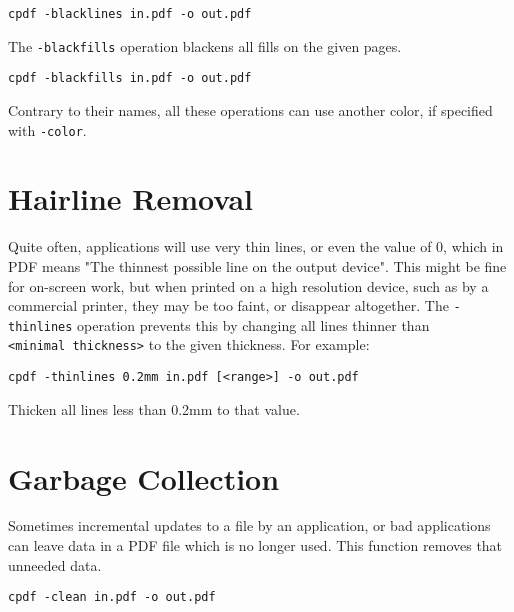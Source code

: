 \documentclass{book}
\begin{document}
  \begin{framed}
    \small\verb!cpdf -blacklines in.pdf -o out.pdf!
  \end{framed}


\noindent The \texttt{-blackfills} operation blackens all fills on the given pages.

  \begin{framed}
    \small\verb!cpdf -blackfills in.pdf -o out.pdf!
  \end{framed}

\noindent Contrary to their names, all these operations can use another color, if specified with \texttt{-color}.

  \section{Hairline Removal}
  Quite often, applications will use very thin lines, or even the value of 0,
which in PDF means "The thinnest possible line on the output device". This
might be fine for on-screen work, but when printed on a high resolution device,
such as by a commercial printer, they may be too faint, or disappear
altogether. The \texttt{-thinlines} operation prevents this by changing all lines
thinner than \texttt{<minimal~thickness>} to the given thickness. For example:
  \begin{framed}
  \small\noindent\verb!cpdf -thinlines 0.2mm in.pdf [<range>] -o out.pdf!

  \vspace{2.5mm}
  \noindent Thicken all lines less than 0.2mm to that value.
  \end{framed} 

  \section{Garbage Collection}
  Sometimes incremental updates to a file by an application, or bad
applications can leave data in a PDF file which is no longer used. This
function removes that unneeded data.

  \begin{framed}
  \small\noindent\verb!cpdf -clean in.pdf -o out.pdf!
  \end{framed}
 
\end{document}
